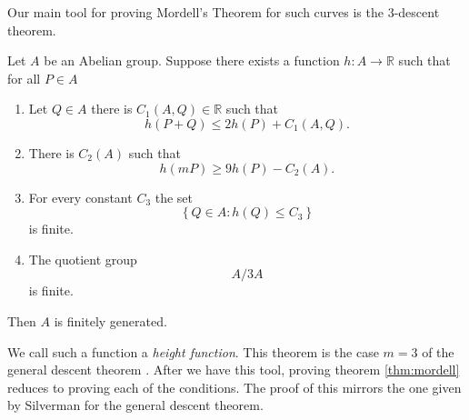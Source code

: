 Our main tool for proving Mordell's Theorem for such curves
is the $3$-descent theorem.
\begin{theorem} \label{thm:3descent}
  Let $A$ be an Abelian group.
  Suppose there exists a function
  $h: A \to \mathbb{R}$
  such that for all $P \in A$
  \begin{enumerate}
    \item Let $Q \in A$ there
      is $C_1(A, Q) \in \mathbb{R}$
      such that
      \begin{equation} \label{eq:boundHeight}
        h(P + Q) \leq 2h(P) + C_1(A, Q).
      \end{equation}
    \item There is $C_2(A)$ such that
      \begin{equation} \label{eq:boundMultipleHeight}
        h(mP) \geq 9 h(P) - C_2(A).
      \end{equation}
    \item For every constant $C_3$
      the set
      \begin{equation} \label{eq:finitePoints}
        \left\{ Q \in A : h(Q) \leq C_3 \right\}
      \end{equation}
      is finite.
    \item The quotient group
      \begin{equation} \label{eq:quotient}
        A/3A
      \end{equation}
      is finite.
  \end{enumerate}
  Then $A$ is finitely generated.
\end{theorem}
We call such a function a \textit{height function}.
This theorem is the case $m = 3$ of the general descent theorem
\cite[theorem 3.1]{silvermanArithmetic}.
After we have this tool, proving theorem \ref{thm:mordell}
reduces to proving each of the conditions.
The proof of this mirrors the one given
by Silverman for the general descent theorem.

